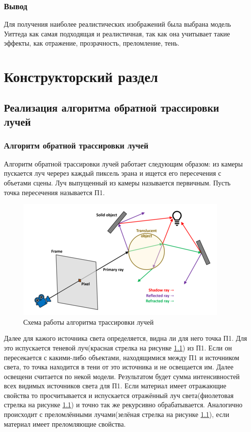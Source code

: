 \documentclass[12pt,a4paper,oneside]{report}
\begin{document}
			\subsection{Вывод}
				\quad Для получения наиболее реалистических изображений была выбрана модель Уиттеда как самая подходящая и реалистичная, так как она учитывает такие эффекты, как отражение, прозрачность, преломление, тень.
	\chapter{Конструкторский раздел}
		\section{Реализация алгоритма обратной трассировки лучей}
			\subsection{Алгоритм обратной трассировки лучей}
				\quad Алгоритм обратной трассировки лучей работает следующим образом: из камеры пускается луч черерез каждый пиксель эрана и ищется его пересечения с объетами сцены. Луч выпущенный из камеры называется первичным. Пусть точка пересечения называется П1.
				
				\begin{figure}[h]
					\centering
					\includegraphics[scale=0.6]{trace}
					\caption{Схема работы алгоритма трассировки лучей}
					\label{fig:trace}
				\end{figure}				
				
				\quad Далее для кажого источника света определяется, видна ли для него точка П1. Для это испускается теневой луч(красная стрелка на рисунке \ref{fig:trace}) из П1. Если он пересекается с какими-либо объектами, находящимися между П1 и источником света, то точка находится в тени от это источника и не освещается им. Далее освещени считается по некой модели. Результатом будет сумма интенсивностей всех видимых источников света для П1. Если материал имеет отражающие свойства то просчитывается и испускается отражённый луч света(фиолетовая стрелка на рисунке \ref{fig:trace}) и точно так же рекурсивно обрабатывается. Аналогично происходит с преломлёнными лучами(зелёная стрелка на рисунке \ref{fig:trace}), если материал имеет преломляющие свойства.
				
\end{document}

